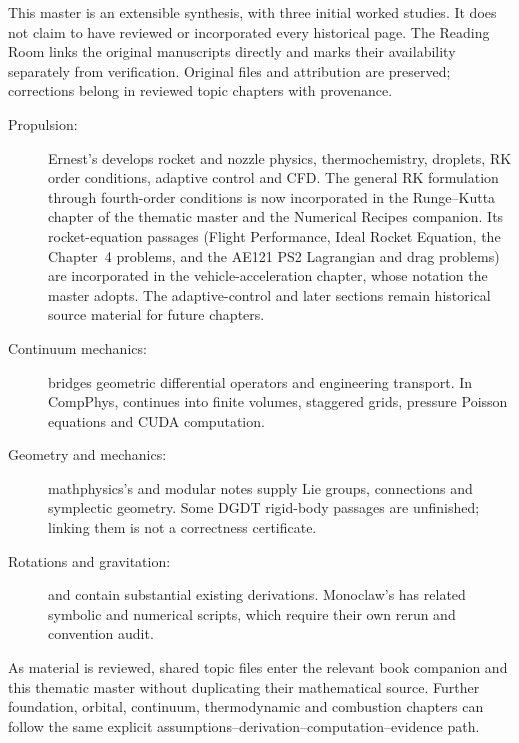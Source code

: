 This master is an extensible synthesis, with three initial worked studies.
It does not claim to have reviewed or incorporated every historical page.
The Reading Room links the original manuscripts directly and marks their
availability separately from verification. Original files and attribution are
preserved; corrections belong in reviewed topic chapters with provenance.

\begin{description}
\item[Propulsion:] Ernest's  develops rocket
and nozzle physics, thermochemistry, droplets, RK order conditions, adaptive
control and CFD. The general RK formulation through fourth-order conditions is now incorporated
in the Runge--Kutta chapter of the thematic master and the Numerical
Recipes companion. Its rocket-equation passages (Flight Performance, Ideal
Rocket Equation, the Chapter~4 problems, and the AE121 PS2 Lagrangian and
drag problems) are incorporated in the vehicle-acceleration chapter, whose
notation the master adopts. The adaptive-control and later sections remain historical
source material for future chapters.
\item[Continuum mechanics:]  bridges
geometric differential operators and engineering transport. In CompPhys,
 continues into finite volumes, staggered grids,
pressure Poisson equations and CUDA computation.
\item[Geometry and mechanics:] mathphysics's 
and modular  notes supply Lie groups, connections and symplectic
geometry. Some DGDT rigid-body passages are unfinished; linking them is not
a correctness certificate.
\item[Rotations and gravitation:] 
and  contain substantial existing derivations.
Monoclaw's  has related symbolic
and numerical scripts, which require their own rerun and convention audit.
\end{description}

As material is reviewed, shared topic files enter the relevant book companion
and this thematic master without duplicating their mathematical source.
Further foundation, orbital, continuum, thermodynamic and combustion chapters
can follow the same explicit assumptions--derivation--computation--evidence path.
